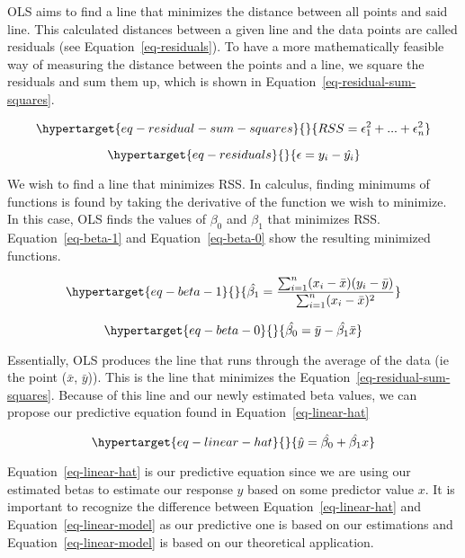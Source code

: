 \documentclass[
  letterpaper,
  DIV=11,
  numbers=noendperiod]{scrreprt}
\begin{document}
OLS aims to find a line that minimizes the distance between all points
and said line. This calculated distances between a given line and the
data points are called residuals (see Equation~\ref{eq-residuals}). To
have a more mathematically feasible way of measuring the distance
between the points and a line, we square the residuals and sum them up,
which is shown in Equation~\ref{eq-residual-sum-squares}.

\begin{equation}\protect\hypertarget{eq-residual-sum-squares}{}{
RSS = \epsilon^2_1 + ... + \epsilon^2_n
}\label{eq-residual-sum-squares}\end{equation}

\begin{equation}\protect\hypertarget{eq-residuals}{}{
\epsilon = y_i - \hat{y_i}
}\label{eq-residuals}\end{equation}

We wish to find a line that minimizes RSS. In calculus, finding minimums
of functions is found by taking the derivative of the function we wish
to minimize. In this case, OLS finds the values of \(\beta_0\) and
\(\beta_1\) that minimizes RSS. Equation~\ref{eq-beta-1} and
Equation~\ref{eq-beta-0} show the resulting minimized functions.

\begin{equation}\protect\hypertarget{eq-beta-1}{}{
\hat{\beta_1} = \frac{\sum_{i=1}^{n}(x_i - \bar{x})(y_i - \bar{y})}{\sum_{i=1}^{n}(x_i - \bar{x})^2}
}\label{eq-beta-1}\end{equation}

\begin{equation}\protect\hypertarget{eq-beta-0}{}{
\hat{\beta_0} = \bar{y} - \hat{\beta_1}\bar{x}
}\label{eq-beta-0}\end{equation}

Essentially, OLS produces the line that runs through the average of the
data (ie the point (\(\bar{x}\), \(\bar{y}\))). This is the line that
minimizes the Equation~\ref{eq-residual-sum-squares}. Because of this
line and our newly estimated beta values, we can propose our predictive
equation found in Equation~\ref{eq-linear-hat}

\begin{equation}\protect\hypertarget{eq-linear-hat}{}{
\hat{y} = \hat{\beta_0} + \hat{\beta_1}x
}\label{eq-linear-hat}\end{equation}

Equation~\ref{eq-linear-hat} is our predictive equation since we are
using our estimated betas to estimate our response \(y\) based on some
predictor value \(x\). It is important to recognize the difference
between Equation~\ref{eq-linear-hat} and Equation~\ref{eq-linear-model}
as our predictive one is based on our estimations and
Equation~\ref{eq-linear-model} is based on our theoretical application.
\end{document}
